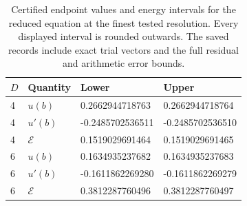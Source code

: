 \begin{table}[htbp]
\centering
\caption{Certified endpoint values and energy intervals for the reduced equation at the finest tested resolution. Every displayed interval is rounded outwards. The saved records include exact trial vectors and the full residual and arithmetic error bounds.}
\label{tab:signed_second_endpoints}
\begin{tabular}{llll}
\toprule
$D$ & Quantity & Lower & Upper \\
\midrule
4 & $u(b)$ & 0.2662944718763 & 0.2662944718764 \\
4 & $u'(b)$ & -0.2485702536511 & -0.2485702536510 \\
4 & $\mathcal E$ & 0.1519029691464 & 0.1519029691465 \\
6 & $u(b)$ & 0.1634935237682 & 0.1634935237683 \\
6 & $u'(b)$ & -0.1611862269280 & -0.1611862269279 \\
6 & $\mathcal E$ & 0.3812287760496 & 0.3812287760497 \\
\bottomrule
\end{tabular}
\end{table}
